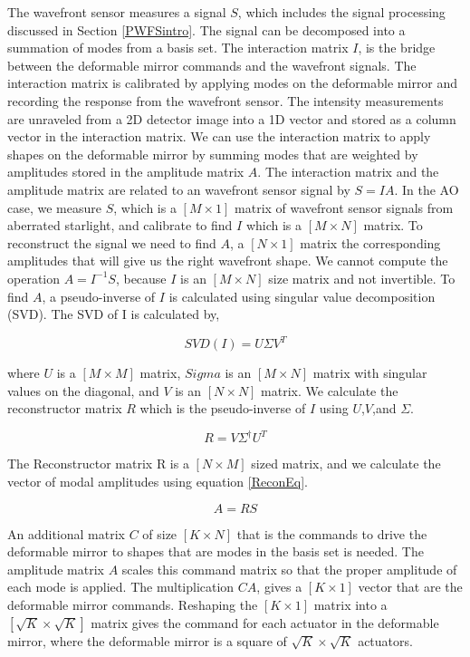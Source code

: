 The wavefront sensor measures a signal $S$, which includes the signal processing discussed in Section \ref{PWFSintro}. The signal can be decomposed into a summation of modes from a basis set. The interaction matrix $I$, is the bridge between the deformable mirror commands and the wavefront signals. The interaction matrix is calibrated by applying modes on the deformable mirror and recording the response from the wavefront sensor. The intensity measurements are unraveled from a 2D detector image into a 1D vector and stored as a column vector in the interaction matrix. We can use the interaction matrix to apply shapes on the deformable mirror by summing modes that are weighted by amplitudes stored in the amplitude matrix $A$. The interaction matrix and the amplitude matrix are related to an wavefront sensor signal by $S=IA$. In the AO case, we measure $S$, which is a $[M\times 1]$ matrix of wavefront sensor signals from aberrated starlight, and calibrate to find $I$ which is a $[M\times N]$ matrix. To reconstruct the signal we need to find $A$, a $[N\times 1]$ matrix the corresponding amplitudes that will give us the right wavefront shape. We cannot compute the operation $A=I^{-1}S$, because $I$ is an $[M\times N]$ size matrix and not invertible. To find $A$, a pseudo-inverse of $I$ is calculated using singular value decomposition (SVD). The SVD of I is calculated by,

\begin{equation}
    SVD(I)=U\Sigma V^T
\end{equation}

where $U$ is a $[M\times M]$ matrix, $Sigma$ is an $[M\times N]$ matrix with singular values on the diagonal, and $V$ is an $[N\times N]$ matrix. We calculate the reconstructor matrix $R$ which is the pseudo-inverse of $I$ using $U$,$V$,and $\Sigma$.

\begin{equation}
   R=V\Sigma^{\dag}U^T
\end{equation}

The Reconstructor matrix R is a $[N\times M]$ sized matrix, and we calculate the vector of modal amplitudes using equation \ref{ReconEq}.

\begin{equation}
    A=RS
    \label{ReconEq}
\end{equation}

An additional matrix $C$ of size $[K\times N]$ that is the commands to drive the deformable mirror to shapes that are modes in the basis set is needed. The amplitude matrix $A$ scales this command matrix so that the proper amplitude of each mode is applied. The multiplication $CA$, gives a $[K\times 1]$ vector that are the deformable mirror commands. Reshaping the $[K\times 1]$ matrix into a $[\sqrt{K}\times \sqrt{K}]$ matrix gives the command for each actuator in the deformable mirror, where the deformable mirror is a square of $\sqrt{K}\times \sqrt{K}$ actuators.